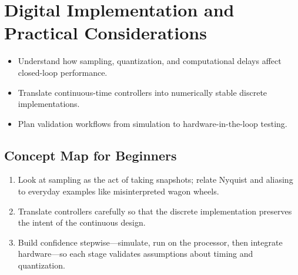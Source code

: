 \chapter{Digital Implementation and Practical Considerations}
\label{chap:digital}

\begin{learningobjective}
\begin{itemize}[leftmargin=*]
    \item Understand how sampling, quantization, and computational delays affect closed-loop performance.
    \item Translate continuous-time controllers into numerically stable discrete implementations.
    \item Plan validation workflows from simulation to hardware-in-the-loop testing.
\end{itemize}
\end{learningobjective}

\section{Concept Map for Beginners}
\begin{conceptroadmap}
\begin{enumerate}[leftmargin=*]
    \item Look at sampling as the act of taking snapshots; relate Nyquist and aliasing to everyday examples like misinterpreted wagon wheels.
    \item Translate controllers carefully so that the discrete implementation preserves the intent of the continuous design.
    \item Build confidence stepwise—simulate, run on the processor, then integrate hardware—so each stage validates assumptions about timing and quantization.
\end{enumerate}
\end{conceptroadmap}

